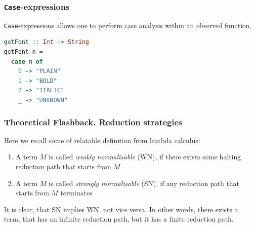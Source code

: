 \documentclass[10pt,pdf,utf8,russian,aspectratio=169]{beamer}
\begin{document}
\begin{frame}[fragile]
  \frametitle{\verb"Case"-expressions}

\verb"Case"-expressions allows one to perform case analysis within an observed function.

  \begin{lstlisting}[language=Haskell]
getFont :: Int -> String
getFont n =
  case n of
    0 -> "PLAIN"
    1 -> "BOLD"
    2 -> "ITALIC"
    _ -> "UNKNOWN"
  \end{lstlisting}
\end{frame}

\begin{frame}
  \frametitle{Theoretical Flashback. Reduction strategies}

  Here we recall some of relatable definition from lambda calculus:

  \begin{enumerate}
    \item A term $M$ is called \emph{weakly normalisable} (WN), if there exists some halting reduction path that starts from $M$
    \item A term $M$ is called \emph{strongly normalisable} (SN), if any reduction path that starts from $M$ terminates
  \end{enumerate}

  It is clear, that SN implies WN, not vice versa. In other words, there exists a term, that has an infinite reduction path, but it has a finite reduction path.
\end{frame}
\end{document}
